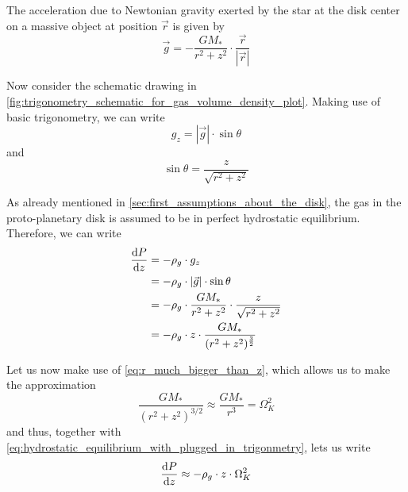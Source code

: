         The acceleration due to Newtonian gravity exerted by the star at the disk center 
        on a massive object at position $\vec r$ is given by
        \begin{equation}
            \vec g = -\frac{GM_*}{r^2+z^2} \cdot \frac{\vec r}{|\vec r|}
        \end{equation}

        Now consider the schematic drawing in
        \cref{fig:trigonometry_schematic_for_gas_volume_density_plot}.
        Making use of basic trigonometry, we can write
        \begin{equation}
            g_z = |\vec g| \cdot \sin\theta
        \end{equation}
        and
        \begin{equation}
            \sin\theta=\frac{z}{\sqrt{r^2+z^2}}
        \end{equation}

        As already mentioned in \cref{sec:first_assumptions_about_the_disk}, the gas in the 
        proto-planetary disk is assumed to be in perfect hydrostatic equilibrium. 
        Therefore, we can write
        \begin{align}
            \frac{\text{d} P}{\text{d} z}
                &= -\rho_g \cdot g_z \\
                &= -\rho_g \cdot |\vec g| \cdot \sin\theta \\
                &= -\rho_g \cdot \frac{GM_*}{r^2+z^2} \cdot\frac{z}{\sqrt{r^2+z^2}} \\
                &= -\rho_g \cdot z \cdot\frac{GM_*}{ (r^2+z^2)^{\frac{3}{2}} }
                \label{eq:hydrostatic_equilibrium_with_plugged_in_trigonmetry}
        \end{align}

        Let us now make use of \cref{eq:r_much_bigger_than_z}, which allows us to make 
        the approximation
        \begin{equation}
            \frac{GM_*}{(r^2+z^2)^{3/2}} \approx \frac{GM_*}{r^3} = \Omega_K^2
        \end{equation}
        and thus, together with \cref{eq:hydrostatic_equilibrium_with_plugged_in_trigonmetry},
        lets us write
        \begin{equation}
            \frac{\text{d} P}{\text{d} z} \approx -\rho_g \cdot z \cdot \Omega_K^2
        \end{equation}

        

